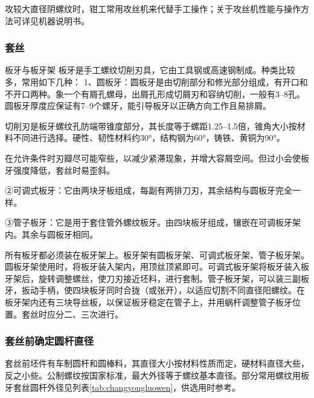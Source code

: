 \documentclass{ctexbook}
\begin{document}
攻较大直径阴螺纹时，钳工常用攻丝机来代替手工操作；关于攻丝机性能与操作方法可详见机器说明书。
\subsubsection{套丝}
板牙与板牙架
板牙是手工螺纹切削刃具，它由工具钢或高速钢制成。种类比较多，常用如下几种：
1、圆板牙：圆板牙是由切削部分和修光部分组成，有开口和不开口两种。象一个有屑孔螺母，出屑孔形成切屑刃和容纳切削，一般有3--8孔。圆板牙厚度应保证有7--9个螺牙，能引导板牙以正确方向工作且易排屑。

切削刃是板牙螺纹孔防端带锥度部分，其长度等于螺距1.25--1.5倍，锥角大小按材料不同进行选择。硬性、韧性材料约30°，结构钢为60°，铸铁、黄铜为90°。

在允许条件时刃瓣尽可能窄些，以减少紧滞现象，并增大容屑空间。但过小会使板牙强度降低，套丝时易歪斜。

②可调式板牙：它由两块牙板组成，每副有两排刀刃，其余结构与圆板牙完全一样。

③管子板牙：它是用于套住管外螺纹板牙。由四块板牙组成，镶嵌在可调板牙架内。其余与圆板牙相同。

所有板牙都必须装在板牙架上。板牙架有圆板牙架、可调式板牙架、管子板牙架。圆板牙架使用时，将板牙装入架内，用顶丝顶紧即可。可调式板牙架将板牙装入板牙架后，旋转调整螺丝，使刀刃接近坯料，进行套制。管子板牙架，可以装三副板牙，扳动手柄，使四块板牙同时合拢（或张开），以适应切割不同直径阳螺纹。在板牙架内还有三块导丝板，以保证板牙稳定在管子上，并用蜗杆调整管子板牙位置。套丝时应分二、三次进行。
\subsubsection{套丝前确定圆杆直径}
套丝前坯件有车制圆杆和圆棒料，其直径大小按材料性质而定，硬材料直径大些，反之小些。公制螺纹按国家标准，最大外径等于螺纹基本直径。部分常用螺纹用板牙套丝圆杆外径见列表\ref{tab:changyongluowen}，供选用时参考。
\end{document}
